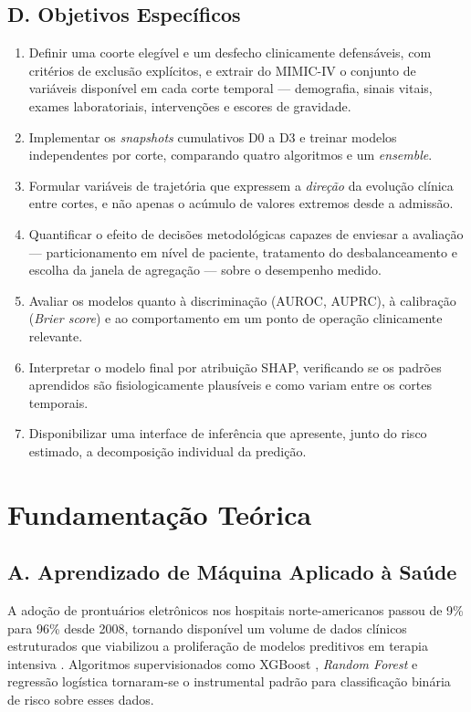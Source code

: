 \documentclass{ieeeaccess}
\begin{document}
\subsection*{D. Objetivos Específicos}
\begin{enumerate}[label=\arabic*.]
\item Definir uma coorte elegível e um desfecho clinicamente defensáveis, com critérios de exclusão explícitos, e extrair do MIMIC-IV o conjunto de variáveis disponível em cada corte temporal --- demografia, sinais vitais, exames laboratoriais, intervenções e escores de gravidade.
\item Implementar os \textit{snapshots} cumulativos D0 a D3 e treinar modelos independentes por corte, comparando quatro algoritmos e um \textit{ensemble}.
\item Formular variáveis de trajetória que expressem a \textit{direção} da evolução clínica entre cortes, e não apenas o acúmulo de valores extremos desde a admissão.
\item Quantificar o efeito de decisões metodológicas capazes de enviesar a avaliação --- particionamento em nível de paciente, tratamento do desbalanceamento e escolha da janela de agregação --- sobre o desempenho medido.
\item Avaliar os modelos quanto à discriminação (AUROC, AUPRC), à calibração (\textit{Brier score}) e ao comportamento em um ponto de operação clinicamente relevante.
\item Interpretar o modelo final por atribuição SHAP, verificando se os padrões aprendidos são fisiologicamente plausíveis e como variam entre os cortes temporais.
\item Disponibilizar uma interface de inferência que apresente, junto do risco estimado, a decomposição individual da predição.
\end{enumerate}

\section{Fundamentação Teórica}

\subsection*{A. Aprendizado de Máquina Aplicado à Saúde}
A adoção de prontuários eletrônicos nos hospitais norte-americanos passou de 9\% para 96\% desde 2008, tornando disponível um volume de dados clínicos estruturados que viabilizou a proliferação de modelos preditivos em terapia intensiva \cite{Patton2023}. Algoritmos supervisionados como XGBoost \cite{Chen2016}, \textit{Random Forest} \cite{Breiman2001} e regressão logística tornaram-se o instrumental padrão para classificação binária de risco sobre esses dados.
\end{document}
